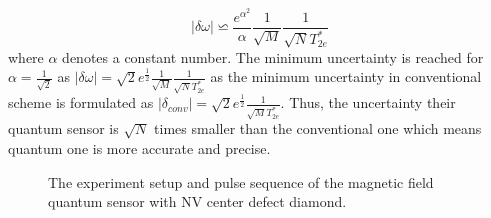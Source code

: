 \documentclass[11pt]{article}
\begin{document}
\begin{equation}
	|\delta \omega| \backsimeq \frac{e^{\alpha^2}}{\alpha} \frac{1}{\sqrt{M}} \frac{1}{\sqrt{N}T_{2e}^*}
\end{equation}
where $\alpha$ denotes a constant number. The minimum uncertainty is reached for $\alpha = \frac{1}{\sqrt{2}}$ as $|\delta \omega| = \sqrt{2}e^{\frac{1}{2}} \frac{1}{\sqrt{M}} \frac{1}{\sqrt{N}T^*_{2e}}$ as the minimum uncertainty in conventional scheme is formulated as $|\delta_{conv}| =\sqrt{2}e^{\frac{1}{2}} \frac{1}{\sqrt{M}T^*_{2e}}$. Thus, the uncertainty their quantum sensor is $\sqrt{N}$ times smaller than the conventional one which means quantum one is more accurate and precise. 




\begin{figure}
	\centering
	\caption{The experiment setup and pulse sequence of the magnetic field quantum sensor with NV center defect diamond.}
\end{figure}
\end{document}
